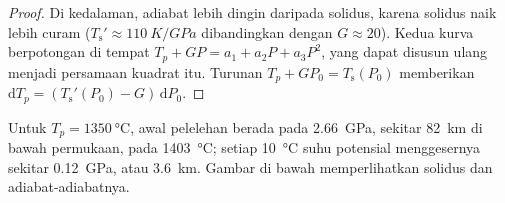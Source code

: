 \begin{proof}
Di kedalaman, adiabat lebih dingin daripada solidus, karena solidus naik lebih
curam ($T_{\mathrm
s}' \approx \qty{110}{K/GPa}$ dibandingkan dengan $G \approx 20$). Kedua kurva berpotongan di tempat
$T_p + GP = a_1 + a_2P + a_3P^2$, yang dapat disusun ulang menjadi persamaan kuadrat itu. Turunan
$T_p + GP_0 = T_{\mathrm s}(P_0)$ memberikan $\mathrm dT_p = (T_{\mathrm s}'(P_0) -
G)\,\mathrm dP_0$.
\end{proof}

Untuk $T_p = \qty{1350}{\celsius}$, awal pelelehan berada pada \qty{2.66}{GPa}, sekitar
\qty{82}{km} di bawah permukaan, pada \qty{1403}{\celsius}; setiap \qty{10}{\celsius} suhu
potensial menggesernya sekitar \qty{0.12}{GPa}, atau \qty{3.6}{km}. Gambar di bawah
memperlihatkan solidus dan adiabat-adiabatnya.

